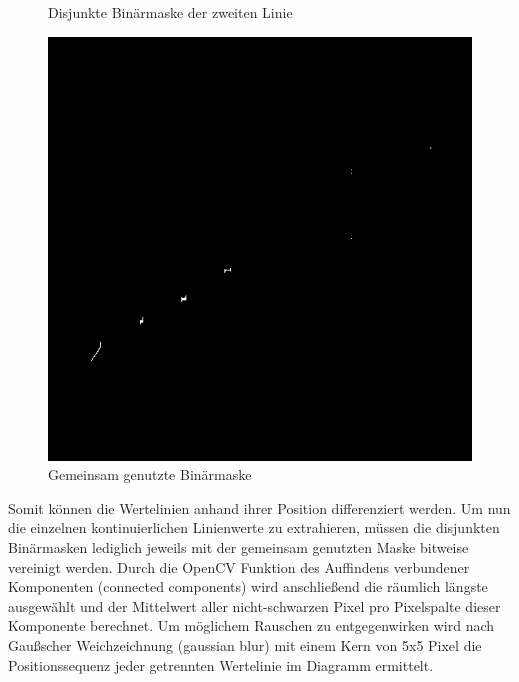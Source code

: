 \begin{figure}[H]
\begin{minipage}{0.315\textwidth}
        \caption{ Disjunkte Binärmaske der zweiten Linie}
        \label{fig:alg_layer2}
    \end{minipage}\hfill %
    \begin{minipage}{0.315\textwidth} %
        \centering
        \includegraphics[width=\linewidth]{Implementation/img/alg_shared.png}
        \caption{ Gemeinsam genutzte Binärmaske}
        \label{fig:alg_shared}
    \end{minipage}
\end{figure}

Somit können die Wertelinien anhand ihrer Position differenziert werden. Um nun die einzelnen kontinuierlichen Linienwerte zu extrahieren, müssen die disjunkten Binärmasken lediglich jeweils mit der gemeinsam genutzten Maske bitweise vereinigt werden. Durch die OpenCV Funktion des Auffindens verbundener Komponenten (connected components) wird anschließend die räumlich längste ausgewählt und der Mittelwert aller nicht-schwarzen Pixel pro Pixelspalte dieser Komponente berechnet. Um möglichem Rauschen zu entgegenwirken wird nach Gaußscher Weichzeichnung (gaussian blur) mit einem Kern von 5x5 Pixel die Positionssequenz jeder getrennten Wertelinie im Diagramm ermittelt.

